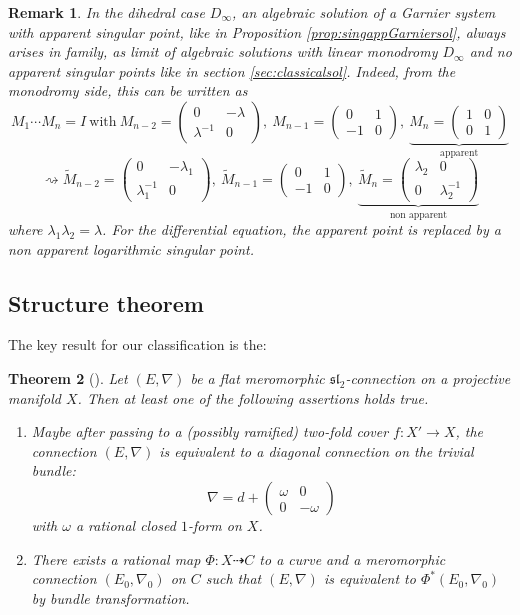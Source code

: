 \documentclass[12]{amsart}
\newtheorem{thm}{Theorem}
\newtheorem{remark}[thm]{Remark}
\begin{document}
\begin{remark}\label{rem:ApparentDihedral}
In the dihedral case $D_\infty$, an algebraic solution of a Garnier system with apparent singular point,
like in Proposition \ref{prop:singappGarniersol}, always arises in family, as limit of algebraic 
solutions with linear monodromy $D_\infty$ and no apparent singular points like in section \ref{sec:classicalsol}.
Indeed, from the monodromy side, this can be written as
$$M_1\cdots M_n=I\ \text{with}\ M_{n-2}=\begin{pmatrix}0&-\lambda\\ \lambda^{-1}&0\end{pmatrix},\ 
M_{n-1}=\begin{pmatrix}0&1\\ -1&0\end{pmatrix},\ 
\underbrace{M_{n}=\begin{pmatrix}1&0\\ 0&1\end{pmatrix}}_{\text{apparent}}$$
$$\rightsquigarrow
\tilde M_{n-2}=\begin{pmatrix}0&-\lambda_1\\ \lambda_1^{-1}&0\end{pmatrix},\ 
\tilde M_{n-1}=\begin{pmatrix}0&1\\ -1&0\end{pmatrix},\ 
\underbrace{\tilde M_{n}=\begin{pmatrix}\lambda_2&0\\ 0&\lambda_2^{-1}\end{pmatrix}}_{\text{non apparent}}$$
where $\lambda_1\lambda_2=\lambda$. For the differential equation, the apparent point is replaced by a non apparent
logarithmic singular point.
\end{remark}

\subsection{Structure theorem}

The key result for our classification is the:

\begin{thm}[\cite{LPT}]Let $(E,\nabla)$ be a flat meromorphic $\mathfrak{sl}_2$-connection 
on a projective manifold $X$. Then at least one of the following assertions holds true.
\begin{enumerate}
\item Maybe after passing to a (possibly ramified) two-fold cover $f: X' \to X$,
the connection $(E,\nabla)$ is equivalent to a diagonal connection on the trivial bundle:
$$\nabla=d+\begin{pmatrix}\omega&0\\ 0&-\omega\end{pmatrix}$$
with $\omega$ a rational closed $1$-form on $X$.
\item There exists a rational map $\Phi: X \dashrightarrow C$ to a curve and a meromorphic connection $(E_0,\nabla_0)$ on $C$
such that $(E,\nabla)$ is equivalent to $\Phi^*(E_0,\nabla_0)$ by bundle transformation.
\end{enumerate}
\end{thm}
\end{document}
